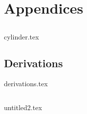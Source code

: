 \documentclass[UKenglish]{texmex/uiomasterthesis}
\begin{document}
















\backmatter{}






\part*{Appendices}

\appendix





\chapter{}\label{app:special}
    {{cylinder.tex}}

\chapter{Derivations}\label{app:derivations}
    {{derivations.tex}}


\chapter{}\label{app:stablesym}
    {{untitled2.tex}}




    





\end{document}
